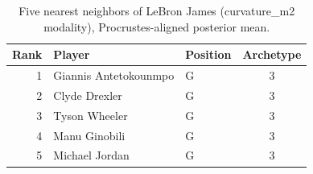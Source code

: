 \begin{table}[htbp]
  \centering\small
  \begin{tabular}{rllc}
    \toprule
    Rank & Player & Position & Archetype \\
    \midrule
    1 & Giannis Antetokounmpo & G & 3 \\
    2 & Clyde Drexler & G & 3 \\
    3 & Tyson Wheeler & G & 3 \\
    4 & Manu Ginobili & G & 3 \\
    5 & Michael Jordan & G & 3 \\
    \bottomrule
  \end{tabular}
  \caption{Five nearest neighbors of LeBron James (curvature_m2 modality), Procrustes-aligned posterior mean.}
  \label{tab:LeBron_James_neighbors_curvature_m2}
\end{table}

